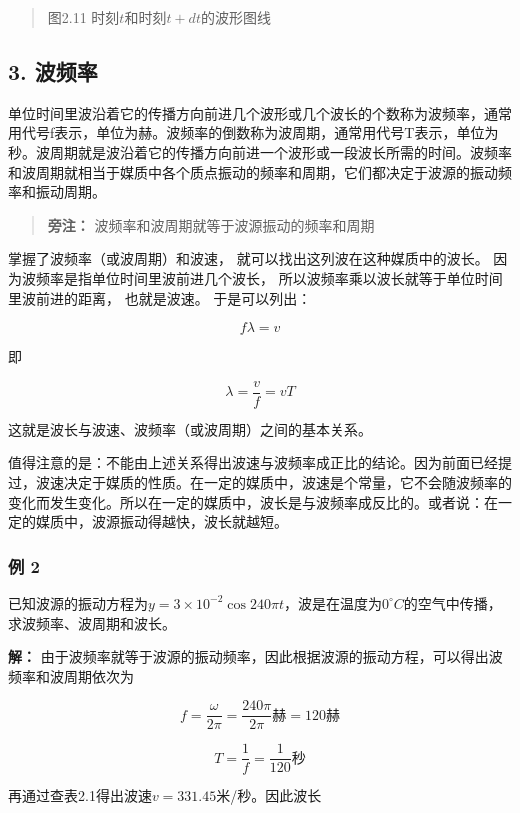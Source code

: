 \begin{quote}
图2.11 时刻\(t\)和时刻\(t + dt\)的波形图线
\end{quote}

\subsection{3. 波频率}\label{ux6ce2ux9891ux7387}

单位时间里波沿着它的传播方向前进几个波形或几个波长的个数称为波频率，通常用代号f表示，单位为赫。波频率的倒数称为波周期，通常用代号T表示，单位为秒。波周期就是波沿着它的传播方向前进一个波形或一段波长所需的时间。波频率和波周期就相当于媒质中各个质点振动的频率和周期，它们都决定于波源的振动频率和振动周期。

\begin{quote}
\textbf{旁注：} 波频率和波周期就等于波源振动的频率和周期
\end{quote}

掌握了波频率（或波周期）和波速， 就可以找出这列波在这种媒质中的波长。
因为波频率是指单位时间里波前进几个波长，
所以波频率乘以波长就等于单位时间里波前进的距离， 也就是波速。
于是可以列出：

\[
f \lambda = v
\]

即

\[
\lambda = \frac {v}{f} = v T \tag {2.1}
\]

这就是波长与波速、波频率（或波周期）之间的基本关系。

值得注意的是：不能由上述关系得出波速与波频率成正比的结论。因为前面已经提过，波速决定于媒质的性质。在一定的媒质中，波速是个常量，它不会随波频率的变化而发生变化。所以在一定的媒质中，波长是与波频率成反比的。或者说：在一定的媒质中，波源振动得越快，波长就越短。

\subsubsection{例 2}\label{ux4f8b-2-1}

已知波源的振动方程为\(y = 3 \times 10^{-2} \cos 240 \pi t\)，波是在温度为\(0^{\circ}C\)的空气中传播，求波频率、波周期和波长。

\textbf{解：}
由于波频率就等于波源的振动频率，因此根据波源的振动方程，可以得出波频率和波周期依次为

\[
f = \frac {\omega}{2 \pi} = \frac {240 \pi}{2 \pi} \text{赫} = 120 \text{赫}
\]

\[
T = \frac {1}{f} = \frac {1}{120} \text{秒}
\]

再通过查表2.1得出波速\(v = 331.45\)米/秒。因此波长

